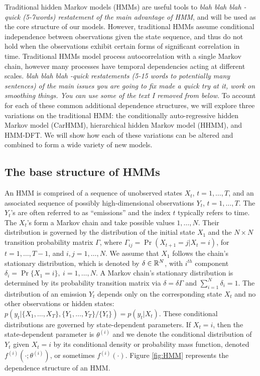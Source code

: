 
Traditional hidden Markov models (HMMs) are useful tools to \textit{blah blah blah - quick (5-7words) restatement of the main advantage of HMM}, and will be used as the core structure of our models.
However, traditional HMMs assume conditional independence between observations given the state sequence, and thus do not hold when the observations exhibit certain forms of significant correlation in time. Traditional HMMs model process autocorrelation with a single Markov chain, however many processes have temporal dependencies acting at different scales. \textit{blah blah blah -quick restatements (5-15 words to potentially many sentences) of the main issues you are going to fix made a quick try at it, work on smoothing things. You can use some of the text I removed from below}. 
To account for each of these common additional dependence structures, we will explore three variations on the traditional HMM: the conditionally auto-regressive hidden Markov model (CarHMM), hierarchical hidden Markov model (HHMM), and HMM-DFT. We will show how each of these variations can be altered and combined to form a wide variety of new models.

\subsection{The base structure of HMMs}

An HMM is comprised of a sequence of unobserved states $X_t$, $t = 1, \ldots, T$, and an associated sequence of  possibly high-dimensional observations $Y_t$, $t = 1, \ldots, T$.
The $Y_t$'s are often referred to as ``emissions'' and the index $t$ typically refers to time. 
The $X_t$'s form a Markov chain and take possible values $1, \ldots, N$. Their distribution is governed by the distribution of the initial state $X_1$ and the $N \times N$ transition probability matrix $\Gamma$, where $\Gamma_{ij} = \Pr(X_{t+1} = j | X_t = i)$, for $t=1,\ldots, T-1$, and $i, j = 1,\ldots, N$. 
%
We assume that $X_1$ follows the chain's stationary distribution, which is denoted by $\delta \in \mathbb{R}^N$, with $i^{th}$ component
$\delta_i = \Pr\{X_1 = i\},~ i = 1,\ldots,N.$
A Markov chain's stationary distribution is determined by its probability transition matrix via $\delta = \delta \Gamma$ and $\sum_{i=1}^N \delta_i = 1$.
%
The distribution of an emission $Y_t$ depends only on the corresponding state $X_t$ and no other observations or hidden states: $p\left(y_t|\{X_1,\ldots, X_T\},\{Y_1,\ldots, Y_T\}/ \{Y_t\}\right) = p(y_t|X_t)$.
%
These conditional distributions are governed by state-dependent parameters. If $X_t = i$, then the state-dependent parameter is $\theta^{(i)}$ and we denote the conditional distribution of $Y_t$ given $X_t=i$ by its conditional density or probability mass function, denoted $f^{(i)}(\cdot ; \theta^{(i)})$, or sometimes  $f^{(i)}(\cdot)$.
%
Figure \ref{fig:HMM} represents the dependence structure of an HMM.

